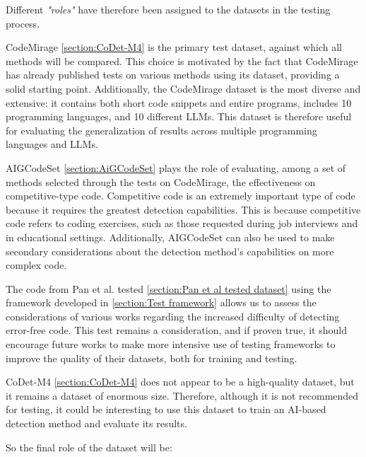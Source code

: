 Different \textit{"roles"} have therefore been assigned to the datasets in the 
testing process.


CodeMirage \ref{section:CoDet-M4}  is the primary test dataset, against which all methods will be compared. 
This choice is motivated by the fact that CodeMirage has already published 
tests on various methods using its dataset, providing a solid starting point. 
Additionally, the CodeMirage dataset is the most diverse and extensive: 
it contains both short code snippets and entire programs, includes 10 
programming languages, and 10 different LLMs. This dataset is therefore 
useful for evaluating the generalization of results across multiple 
programming languages and LLMs.


AIGCodeSet \ref{section:AiGCodeSet} plays the role of evaluating, 
among a set of methods selected 
through the tests on CodeMirage, the effectiveness on competitive-type code. 
Competitive code is an extremely important type of code because it requires the 
greatest detection capabilities. This is because competitive code refers to 
coding exercises, such as those requested during job interviews and in educational 
settings. Additionally, AIGCodeSet can also be used to make secondary considerations 
about the detection method's capabilities on more complex code.


The code from Pan et al. tested \ref{section:Pan et al tested dataset} using the framework developed in 
\ref{section:Test framework} allows us to assess the considerations 
of various works regarding the increased difficulty of detecting error-free code. 
This test remains a consideration, and if proven true, it should encourage future 
works to make more intensive use of testing frameworks to improve the quality of 
their datasets, both for training and testing.


CoDet-M4 \ref{section:CoDet-M4} does not appear to be a high-quality dataset, but it remains a 
dataset of enormous size. Therefore, although it is not recommended for testing, 
it could be interesting to use this dataset to train an AI-based detection method 
and evaluate its results.

So the final role of the dataset will be:

